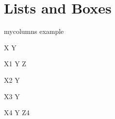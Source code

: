 \documentclass[
	aspectratio=169, %
	8pt, %
]{beamer}
\begin{document}
\section{Lists and Boxes}

\begin{frame}{mycolumns example}
\begin{mycolumns}[leftandright]
X
\mynextcolumn
Y
\end{mycolumns}
\begin{mycolumns}[leftmiddleandright]
X1
\mynextcolumn
Y
\mynextcolumn
Z
\end{mycolumns}
\begin{mycolumns}[leftthenright]
X2
\mynextcolumn
Y
\end{mycolumns}
\begin{mycolumns}[rightthenleft]
X3
\mynextcolumn
Y
\end{mycolumns}
\begin{mycolumns}[leftmiddlethenright]
X4
\mynextcolumn
Y
\mynextcolumn
Z4
\end{mycolumns}
\end{frame}
\end{document}
